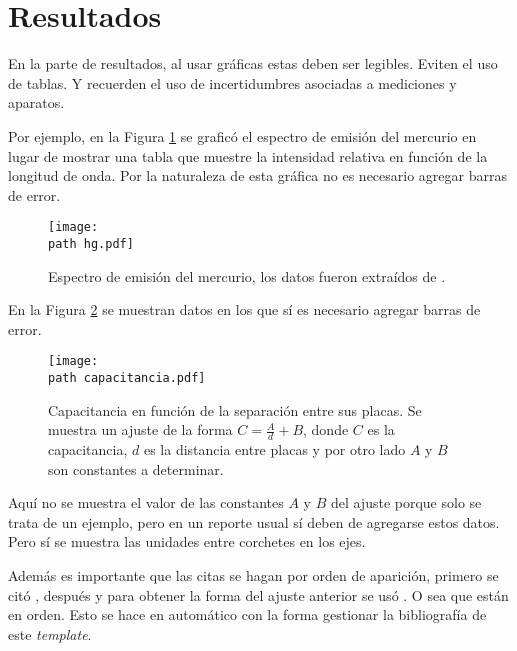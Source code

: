 \section{Resultados}
\label{sec:Resultados}

En la parte de resultados, al usar gráficas estas deben ser legibles. Eviten el uso de tablas. Y recuerden el uso de incertidumbres asociadas a mediciones y aparatos.

Por ejemplo, en la Figura \ref{fig:Hg} se graficó el espectro de emisión del mercurio en lugar de mostrar una tabla que muestre la intensidad relativa en función de la longitud de onda. Por la naturaleza de esta gráfica no es necesario agregar barras de error.

\begin{figure}[H]
	\centering
	\texttt{[image: \\path hg.pdf]}
	\caption{Espectro de emisión del mercurio, los datos fueron extraídos de \cite{nistHg}.}
	\label{fig:Hg}
\end{figure}

En la Figura \ref{fig:Capacitancia} se muestran datos en los que sí es necesario agregar barras de error. 

\begin{figure}[H]
	\centering
	\texttt{[image: \\path capacitancia.pdf]}
	\caption{Capacitancia en función de la separación entre sus placas. Se muestra un ajuste de la forma $ C = \frac{A}{d} + B $, donde $ C $ es la capacitancia, $ d $ es la distancia entre placas y por otro lado $ A $ y $ B $ son constantes a determinar.}
	\label{fig:Capacitancia}
\end{figure}

Aquí no se muestra el valor de las constantes $ A $ y $ B $ del ajuste porque solo se trata de un ejemplo, pero en un reporte usual sí deben de agregarse estos datos. Pero sí se muestra las unidades entre corchetes en los ejes. 

Además es importante que las citas se hagan por orden de aparición, primero se citó \cite{wheeler1955}, después \cite{nistHg} y para obtener la forma del ajuste anterior se usó \cite{griffithsElectrodynamics}. O sea que están en orden. Esto se hace en automático con la forma gestionar la bibliografía de este \textit{template}.